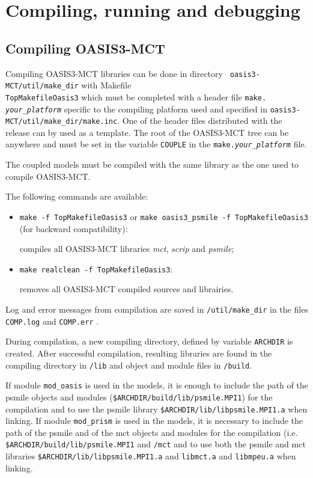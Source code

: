 \newpage
%

\chapter{Compiling, running and debugging}
\label{sec_compilationrunning}

\section{Compiling OASIS3-MCT}
\label{subsec_compile}

Compiling OASIS3-MCT libraries can be done in directory {\tt
  oasis3-MCT/util/make\_dir} with Makefile \\ {\tt TopMakefileOasis3}
which must be completed with a header file {\tt make.{\it
    your\_platform}} specific to the compiling platform used and
specified in {\tt oasis3-MCT/util/make\_dir/make.inc}.  One of the
header files distributed with the release can by used as a template.
The root of the OASIS3-MCT tree can be anywhere and must be set in the
variable {\tt COUPLE} in the {\tt make.{\it your\_platform}} file.

The coupled models must be compiled with the same library as the one 
used to compile OASIS3-MCT.

The following commands are available:

\begin{itemize}
\item {\tt make -f TopMakefileOasis3} or {\tt make oasis3\_psmile -f
    TopMakefileOasis3} (for backward compatibility):

  compiles all OASIS3-MCT libraries {\it mct}, {\it scrip} and {\it
    psmile};

\item {\tt make realclean -f TopMakefileOasis3}:

  removes all OASIS3-MCT compiled sources and librairies.

\end{itemize}

Log and error messages from compilation are saved in {\tt /util/make\_dir} in the files
{\tt COMP.log} and {\tt COMP.err} .

During compilation, a new compiling directory, defined by variable
{\tt ARCHDIR} is created.  After successful compilation, resulting
libraries are found in the compiling directory in {\tt /lib} and
object and module files in {\tt /build}. 

If module {\tt mod\_oasis} is used in the
models, it is enough to include the path of the psmile objects and
modules ({\tt \$ARCHDIR/build/lib/psmile.MPI1}) for the compilation and to use the psmile library {\tt \$ARCHDIR/lib/libpsmile.MPI1.a} when
linking. If module {\tt mod\_prism} is used in the models, it is necessary to
include the path of the psmile and of the mct objects and modules for
the compilation (i.e. {\tt \$ARCHDIR/build/lib/psmile.MPI1} and {\tt /mct} and to use both the psmile and mct libraries {\tt \$ARCHDIR/lib/libpsmile.MPI1.a} and {\tt libmct.a} and {\tt libmpeu.a} when linking.

